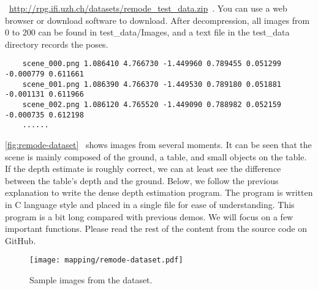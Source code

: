 ~\url{http://rpg.ifi.uzh.ch/datasets/remode_test_data.zip}~. You can use a web browser or download software to download. After decompression, all images from 0 to 200 can be found in test\_data/Images, and a text file in the test\_data directory records the poses.
\begin{lstlisting}
	scene_000.png 1.086410 4.766730 -1.449960 0.789455 0.051299 -0.000779 0.611661
	scene_001.png 1.086390 4.766370 -1.449530 0.789180 0.051881 -0.001131 0.611966
	scene_002.png 1.086120 4.765520 -1.449090 0.788982 0.052159 -0.000735 0.612198
	......
\end{lstlisting}

\autoref{fig:remode-dataset}~ shows images from several moments. It can be seen that the scene is mainly composed of the ground, a table, and small objects on the table. If the depth estimate is roughly correct, we can at least see the difference between the table's depth and the ground. Below, we follow the previous explanation to write the dense depth estimation program. The program is written in C language style and placed in a single file for ease of understanding. This program is a bit long compared with previous demos. We will focus on a few important functions. Please read the rest of the content from the source code on GitHub.

\begin{figure}[!ht]
	\centering
	\texttt{[image: mapping/remode-dataset.pdf]}
	\caption{Sample images from the dataset.}
	\label{fig:remode-dataset}
\end{figure}

